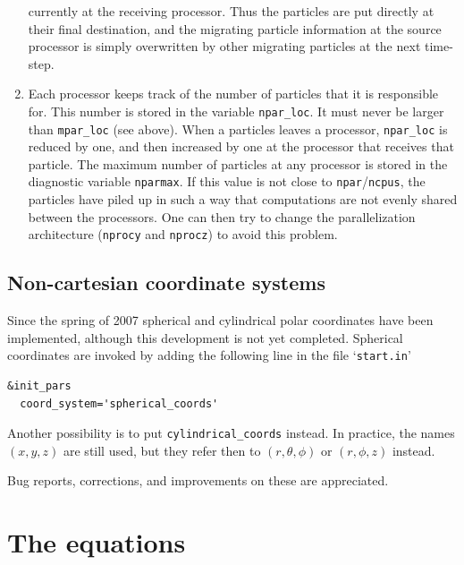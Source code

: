 \documentclass[\mydriver,12pt,twoside,notitlepage,a4paper]{article}
\makeatletter
\newcommand{\code}[1]{\texttt{#1}}
\newcommand{\file}[2][]{%
  \def\index@{#1}%
  `\texttt{#2}'%
  \ifx\index@\@empty\index[file]{#2@\texttt{#2}}%
  \else\index[file]{#1@\texttt{#1}}%
  \fi%
}
\makeatother
\begin{document}
\begin{enumerate}
      currently at the receiving processor. Thus the particles are put directly
      at their final destination, and the migrating particle information at
      the source processor is simply overwritten by other migrating particles
      at the next time-step.
  \item Each processor keeps track of the number of particles that it is
      responsible for. This number is stored in the variable \code{npar_loc}.
      It must never be larger than \code{mpar_loc} (see above). When a
      particles leaves a processor, \code{npar_loc} is reduced by one, and then
      increased by one at the processor that receives that particle. The
      maximum number of particles at any processor is stored in the diagnostic
      variable \code{nparmax}. If this value is not close to
      \code{npar}/\code{ncpus}, the particles have piled up in such a way that
      computations are not evenly shared between the processors. One can then
      try to change the parallelization architecture (\code{nprocy} and
      \code{nprocz}) to avoid this problem.
\end{enumerate}


\subsection{Non-cartesian coordinate systems}

Since the spring of 2007 spherical and cylindrical polar coordinates
have been implemented, although this development is not yet completed.
Spherical coordinates are invoked by adding the following line
in the file \file{start.in}
\begin{verbatim}
&init_pars
  coord_system='spherical_coords'
\end{verbatim}
Another possibility is to put \code{cylindrical_coords} instead.
In practice, the names $(x,y,z)$ are still used, but they refer then
to $(r,\theta,\phi)$ or $(r,\phi,z)$ instead.

Bug reports, corrections, and improvements on these are appreciated.



\section{The equations}
\end{document}
